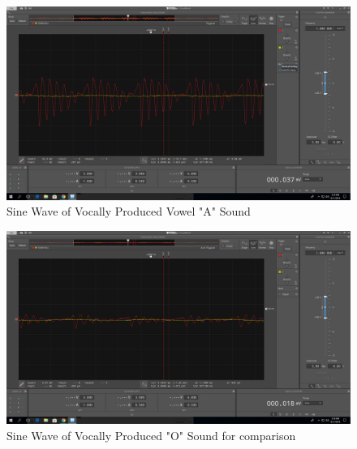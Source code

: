 \documentclass[10pt]{article}
\begin{document}
\begin{center}
	\begin{figure}[H]
		\centering
		\includegraphics[scale=0.22]{images/aaa.png}
		\caption{Sine Wave of Vocally Produced Vowel "A" Sound}
	\end{figure}
	\begin{figure}[H]
		\centering
		\includegraphics[scale=0.22]{images/ooo.png}
		\caption{Sine Wave of Vocally Produced "O" Sound for comparison}
	\end{figure}
\end{center}
\end{document}
